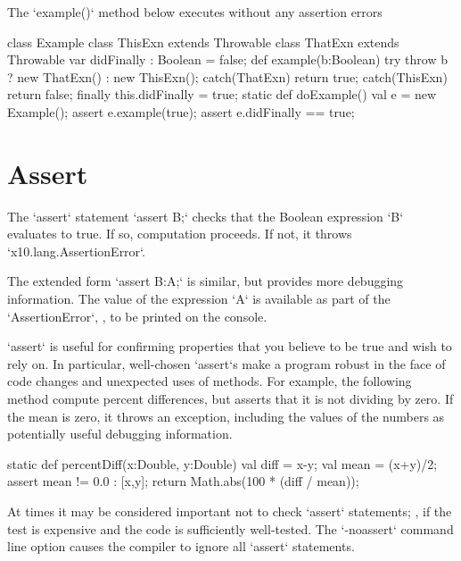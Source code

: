 \begin{ex}
The \xcd`example()` method below executes without any assertion errors
% 
\begin{xten}
class Example {
  class ThisExn extends Throwable {}
  class ThatExn extends Throwable {}
  var didFinally : Boolean = false;
  def example(b:Boolean) {
    try {
       throw b ? new ThatExn() : new ThisExn();
    }
    catch(ThatExn) {return true;}
    catch(ThisExn) {return false;}
    finally {
       this.didFinally = true;
    }
  }
  static def doExample() {
    val e = new Example();
    assert e.example(true);
    assert e.didFinally == true;
  }
}
\end{xten}
% 

\end{ex}


\section{Assert}

The \xcd`assert` statement 
\xcd`assert B;` 
checks that the Boolean expression \xcd`B` evaluates to true.  If so,
computation proceeds.  If not, it throws \xcd`x10.lang.AssertionError`.

The extended form 
\xcd`assert B:A;`
is similar, but provides more debugging information.  The value of the
expression \xcd`A` is available as part of the \xcd`AssertionError`, \eg, to
be printed on the console.

\begin{ex}
\xcd`assert` is useful for confirming properties that you believe to be true
and wish to rely on.  In particular, well-chosen \xcd`assert`s make a program
robust in the face of code changes and unexpected uses of methods.
For example, the following method compute percent differences, but asserts
that it is not dividing by zero.  If the mean is zero, it throws an exception,
including the values of the numbers as potentially useful debugging
information. 
\begin{xten}
static def percentDiff(x:Double, y:Double) {
  val diff = x-y;
  val mean = (x+y)/2;
  assert mean != 0.0  : [x,y]; 
  return Math.abs(100 * (diff / mean));
}
\end{xten}

\end{ex}


At times it may be considered important not to check \xcd`assert` statements;
\eg, if the test is expensive and the code is sufficiently well-tested.  The
\xcd`-noassert` command line option causes the compiler to ignore all
\xcd`assert` statements. 
